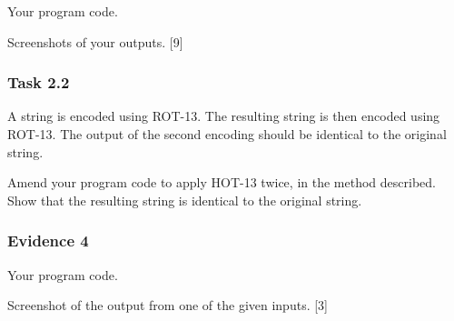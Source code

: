 Your program code.

Screenshots of your outputs. \hfill{}{[}9{]}

\subsubsection*{Task 2.2}

A string is encoded using ROT-13. The resulting string is then encoded
using ROT-13. The output of the second encoding should be identical
to the original string.

Amend your program code to apply HOT-13 twice, in the method described.
Show that the resulting string is identical to the original string.

\subsubsection*{Evidence 4}

Your program code.

Screenshot of the output from one of the given inputs. \hfill{}{[}3{]}